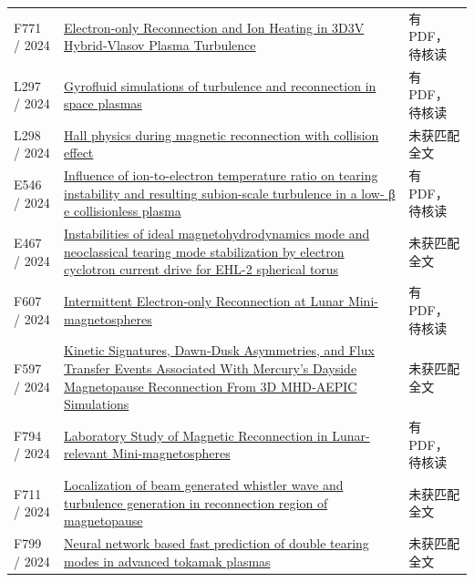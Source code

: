 \documentclass[UTF8,a4paper,11pt,openany,fontset=fandol]{ctexbook}
\begin{document}
\begin{longtable}{P{24mm}P{97mm}P{27mm}}
F771 / 2024 & \href{https://doi.org/10.3847/1538-4357/ad6a19}{Electron-only Reconnection and Ion Heating in 3D3V Hybrid-Vlasov Plasma Turbulence} & 有PDF，待核读\\

L297 / 2024 & \href{https://doi.org/10.1016/j.fpp.2024.100055}{Gyrofluid simulations of turbulence and reconnection in space plasmas} & 有PDF，待核读\\

L298 / 2024 & \href{https://doi.org/10.1088/1361-6587/ad2b8f}{Hall physics during magnetic reconnection with collision effect} & 未获匹配全文\\

E546 / 2024 & \href{https://doi.org/10.1063/5.0185897}{Influence of ion-to-electron temperature ratio on tearing instability and resulting subion-scale turbulence in a low- β e collisionless plasma} & 有PDF，待核读\\

E467 / 2024 & \href{https://doi.org/10.1088/2058-6272/ada421}{Instabilities of ideal magnetohydrodynamics mode and neoclassical tearing mode stabilization by electron cyclotron current drive for EHL-2 spherical torus} & 未获匹配全文\\

F607 / 2024 & \href{https://doi.org/10.3847/2041-8213/ad2774}{Intermittent Electron-only Reconnection at Lunar Mini-magnetospheres} & 有PDF，待核读\\

F597 / 2024 & \href{https://doi.org/10.1029/2024ja032669}{Kinetic Signatures,  Dawn‐Dusk Asymmetries,  and Flux Transfer Events Associated With Mercury's Dayside Magnetopause Reconnection From 3D MHD‐AEPIC Simulations} & 未获匹配全文\\

F794 / 2024 & \href{https://doi.org/10.3847/1538-4357/ad4fff}{Laboratory Study of Magnetic Reconnection in Lunar-relevant Mini-magnetospheres} & 有PDF，待核读\\

F711 / 2024 & \href{https://doi.org/10.1063/5.0169397}{Localization of beam generated whistler wave and turbulence generation in reconnection region of magnetopause} & 未获匹配全文\\

F799 / 2024 & \href{https://doi.org/10.1063/5.0229910}{Neural network based fast prediction of double tearing modes in advanced tokamak plasmas} & 未获匹配全文\\


\end{longtable}
\end{document}
